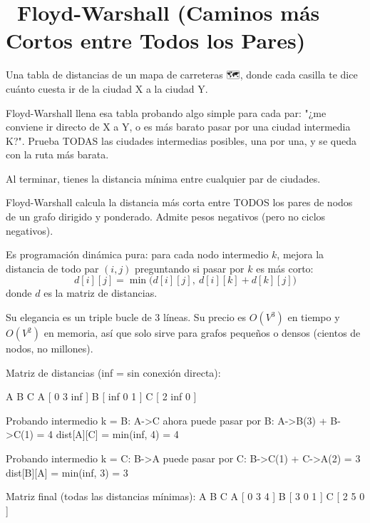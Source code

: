 \chapter[\emj{🌐}~Floyd-Warshall (Todos los Pares)]{~Floyd-Warshall (Caminos más Cortos entre Todos los Pares)}

\begin{dsaquees}

Una tabla de distancias de un mapa de carreteras 🗺️, donde cada casilla
te dice cuánto cuesta ir de la ciudad X a la ciudad Y.

Floyd-Warshall llena esa tabla probando algo simple para cada par:
"¿me conviene ir directo de X a Y, o es más barato pasar por una ciudad
intermedia K?". Prueba TODAS las ciudades intermedias posibles, una por
una, y se queda con la ruta más barata.

Al terminar, tienes la distancia mínima entre cualquier par de ciudades.

\end{dsaquees}

\begin{dsaotraforma}

Floyd-Warshall calcula la distancia más corta entre TODOS los pares de
nodos de un grafo dirigido y ponderado. Admite pesos negativos (pero no
ciclos negativos).

Es programación dinámica pura: para cada nodo intermedio $k$, mejora la
distancia de todo par $(i, j)$ preguntando si pasar por $k$ es más corto:
\[ d[i][j] = \min\big(d[i][j],\ d[i][k] + d[k][j]\big) \]
donde $d$ es la matriz de distancias.

Su elegancia es un triple bucle de 3 líneas. Su precio es $O(V^3)$ en
tiempo y $O(V^2)$ en memoria, así que solo sirve para grafos pequeños o
densos (cientos de nodos, no millones).

\end{dsaotraforma}

\begin{dsadiagrama}
Matriz de distancias (inf = sin conexión directa):

        A    B    C
   A  [ 0    3    inf ]
   B  [ inf  0    1   ]
   C  [ 2    inf  0   ]

Probando intermedio k = B:
  A->C ahora puede pasar por B: A->B(3) + B->C(1) = 4
  dist[A][C] = min(inf, 4) = 4

Probando intermedio k = C:
  B->A puede pasar por C: B->C(1) + C->A(2) = 3
  dist[B][A] = min(inf, 3) = 3

Matriz final (todas las distancias mínimas):
        A    B    C
   A  [ 0    3    4 ]
   B  [ 3    0    1 ]
   C  [ 2    5    0 ]
\end{dsadiagrama}

